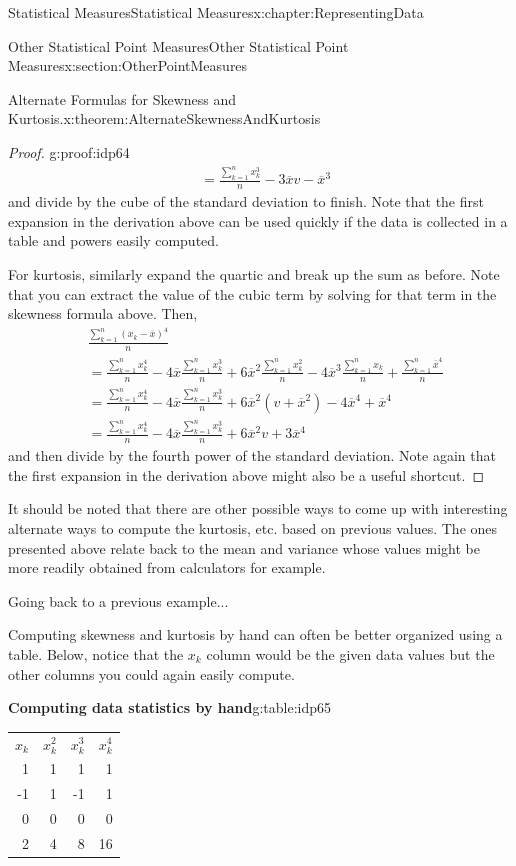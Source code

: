 \documentclass[oneside,10pt,]{book}
\newcommand{\tabularfont}{\relax}
\numberwithin{equation}{section}
\newcommand{\hrulemedium}{\noalign{\hrule height 0.07em}}
\begin{document}
\begin{chapterptx}{Statistical Measures}{}{Statistical Measures}{}{}{x:chapter:RepresentingData}
\begin{sectionptx}{Other Statistical Point Measures}{}{Other Statistical Point Measures}{}{}{x:section:OtherPointMeasures}
\begin{theorem}{Alternate Formulas for Skewness and Kurtosis.}{}{x:theorem:AlternateSkewnessAndKurtosis}
\begin{proof}{}{g:proof:idp64}
\begin{align*}
& = \frac{\sum_{k=1}^n x_k^3}{n} - 3 \overline{x}v - \overline{x}^3
\end{align*}
and divide by the cube of the standard deviation to finish. Note that the first expansion in the derivation above can be used quickly if the data is collected in a table and powers easily computed.%
\par
For kurtosis, similarly expand the quartic and break up the sum as before. Note that you can extract the value of the cubic term by solving for that term in the skewness formula above. Then,%
\begin{align*}
& \frac{\sum_{k=1}^n ( x_k-\overline{x} )^4}{n}\\
& = \frac{\sum_{k=1}^n x_k^4}{n} - 4 \overline{x} \frac{\sum_{k=1}^n x_k^3 }{n} + 6 \overline{x}^2 \frac{\sum_{k=1}^n x_k^2}{n} - 4 \overline{x}^3 \frac{\sum_{k=1}^n x_k}{n} + \frac{\sum_{k=1}^n \overline{x}^4}{n}\\
& = \frac{\sum_{k=1}^n x_k^4}{n} - 4 \overline{x} \frac{\sum_{k=1}^n x_k^3 }{n} + 6 \overline{x}^2 (v+\overline{x}^2) - 4 \overline{x}^4 + \overline{x}^4\\
& = \frac{\sum_{k=1}^n x_k^4}{n} - 4 \overline{x} \frac{\sum_{k=1}^n x_k^3 }{n} + 6 \overline{x}^2 v + 3 \overline{x}^4 
\end{align*}
and then divide by the fourth power of the standard deviation.  Note again that the first expansion in the derivation above might also be a useful shortcut.%
\end{proof}
\end{theorem}
It should be noted that there are other possible ways to come up with interesting alternate ways to compute the kurtosis, etc. based on previous values. The ones presented above relate back to the mean and variance whose values might be more readily obtained from calculators for example.%
\par
Going back to a previous example...%
\par
Computing skewness and kurtosis by hand can often be better organized using a table. Below, notice that the \(x_k\) column would be the given data values but the other columns you could again easily compute. \begin{tableptx}{\textbf{Computing data statistics by hand}}{g:table:idp65}{}%
\centering
{\tabularfont%
\begin{tabular}{rrrr}
\(x_k\)&\(x_k^2\)&\(x_k^3\)&\(x_k^4\)\tabularnewline\hrulemedium
1&1&1&1\tabularnewline[0pt]
-1&1&-1&1\tabularnewline[0pt]
0&0&0&0\tabularnewline[0pt]
2&4&8&16\tabularnewline[0pt]

\end{tabular}}
\end{tableptx}
\end{sectionptx}
\end{chapterptx}
\end{document}
